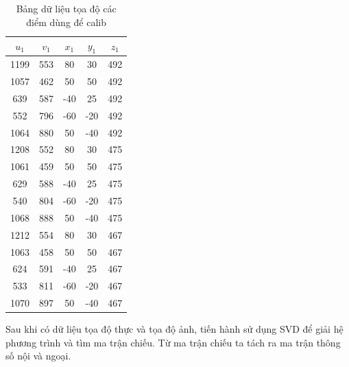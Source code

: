           \begin{table}[H]
               \centering
               \caption{Bảng dữ liệu tọa độ các điểm dùng để calib}
               \begin{tabular}{|c|c|c|c|c|}
               \hline
               $u_1$ & $v_1$ & $x_1$ & $y_1$ & $z_1$ \\
               \hline
               1199 & 553 & 80  & 30  & 492 \\
               1057 & 462 & 50  & 50  & 492 \\
               639  & 587 & -40 & 25  & 492 \\
               552  & 796 & -60 & -20 & 492 \\
               1064 & 880 & 50  & -40 & 492 \\
               1208 & 552 & 80  & 30  & 475 \\
               1061 & 459 & 50  & 50  & 475 \\
               629  & 588 & -40 & 25  & 475 \\
               540  & 804 & -60 & -20 & 475 \\
               1068 & 888 & 50  & -40 & 475 \\
               1212 & 554 & 80  & 30  & 467 \\
               1063 & 458 & 50  & 50  & 467 \\
               624  & 591 & -40 & 25  & 467 \\
               533  & 811 & -60 & -20 & 467 \\
               1070 & 897 & 50  & -40 & 467 \\
               \hline
               \end{tabular}
               \label{tab:s5_calib_data}
          \end{table}
          Sau khi có dữ liệu tọa độ thực và tọa độ ảnh, tiến hành sử dụng SVD để giải hệ phương trình và tìm ma trận chiếu. Từ ma trận chiếu ta tách ra ma trận thông số nội và ngoại.
